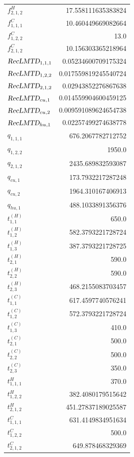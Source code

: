 \documentclass{article}%
\begin{document}
\begin{multicols*}{3}
\begin{supertabular}{lr}
	$f_{2,1,2}^{H}$ & 17.558111635383824 \\%
	$f_{1,1,1}^{C}$ & 10.460449669082664 \\%
	$f_{1,2,2}^{C}$ & 13.0 \\%
	$f_{2,1,2}^{C}$ & 10.156303365218964 \\%
	$\textsl{RecLMTD}_{1,1,1}$ & 0.05234600709175324 \\%
	$\textsl{RecLMTD}_{1,2,2}$ & 0.017559819245540724 \\%
	$\textsl{RecLMTD}_{2,1,2}$ & 0.02943852276867638 \\%
	$\textsl{RecLMTD}_{cu,1}$ & 0.014559904600459125 \\%
	$\textsl{RecLMTD}_{cu,2}$ & 0.009591089624654738 \\%
	$\textsl{RecLMTD}_{hu,1}$ & 0.02257499274638778 \\%
	$q_{1,1,1}$ & 676.2067782712752 \\%
	$q_{1,2,2}$ & 1950.0 \\%
	$q_{2,1,2}$ & 2435.689832593087 \\%
	$q_{cu,1}$ & 173.7932217287248 \\%
	$q_{cu,2}$ & 1964.310167406913 \\%
	$q_{hu,1}$ & 488.1033891356376 \\%
	$t_{1,1}^{(H)}$ & 650.0 \\%
	$t_{1,2}^{(H)}$ & 582.3793221728724 \\%
	$t_{1,3}^{(H)}$ & 387.3793221728725 \\%
	$t_{2,1}^{(H)}$ & 590.0 \\%
	$t_{2,2}^{(H)}$ & 590.0 \\%
	$t_{2,3}^{(H)}$ & 468.2155083703457 \\%
	$t_{1,1}^{(C)}$ & 617.4597740576241 \\%
	$t_{1,2}^{(C)}$ & 572.3793221728724 \\%
	$t_{1,3}^{(C)}$ & 410.0 \\%
	$t_{2,1}^{(C)}$ & 500.0 \\%
	$t_{2,2}^{(C)}$ & 500.0 \\%
	$t_{2,3}^{(C)}$ & 350.0 \\%
	$t_{1,1,1}^{H}$ & 370.0 \\%
	$t_{1,2,2}^{H}$ & 382.4080179515642 \\%
	$t_{2,1,2}^{H}$ & 451.27837189025587 \\%
	$t_{1,1,1}^{C}$ & 631.4149834951634 \\%
	$t_{1,2,2}^{C}$ & 500.0 \\%
	$t_{2,1,2}^{C}$ & 649.878468329369 \\%

\end{supertabular}
\end{multicols*}
\end{document}
